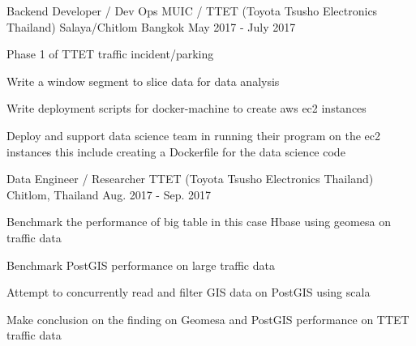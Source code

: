 \begin{cventries}
  \cventry
    {Backend Developer / Dev Ops} %
    {MUIC / TTET (Toyota Tsusho Electronics Thailand)} %
    {Salaya/Chitlom Bangkok} %
    {May 2017 - July 2017} %
    {
      \begin{cvitems} %
        \item {Phase 1 of TTET traffic incident/parking}
        \item {Write a window segment to slice data for data analysis}
        \item {Write deployment scripts for docker-machine to create aws ec2 instances}
        \item {Deploy and support data science team in running their program on the ec2 instances this include creating a Dockerfile for the data science code}
      \end{cvitems}
    }

  \cventry
    {Data Engineer / Researcher} %
    {TTET (Toyota Tsusho Electronics Thailand)} %
    {Chitlom, Thailand} %
    {Aug. 2017 - Sep. 2017} %
    {
      \begin{cvitems} %
        \item {Benchmark the performance of big table in this case Hbase using geomesa on traffic data}
        \item {Benchmark PostGIS performance on large traffic data}
        \item {Attempt to concurrently read and filter GIS data on PostGIS using scala}
        \item {Make conclusion on the finding on Geomesa and PostGIS performance on TTET traffic data}
      \end{cvitems}
    }


\end{cventries}
